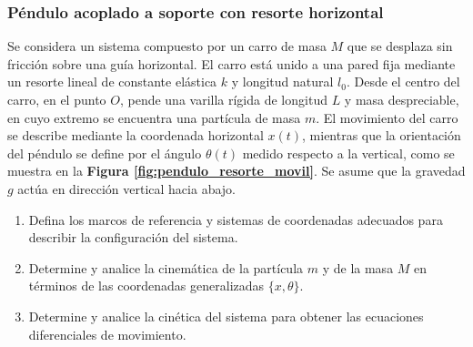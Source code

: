 \subsubsection{Péndulo acoplado a soporte con resorte horizontal}

Se considera un sistema compuesto por un carro de masa $M$ que se desplaza sin fricción sobre una guía horizontal. El carro está unido a una pared fija mediante un resorte lineal de constante elástica $k$ y longitud natural $l_0$. Desde el centro del carro, en el punto $O$, pende una varilla rígida de longitud $L$ y masa despreciable, en cuyo extremo se encuentra una partícula de masa $m$. El movimiento del carro se describe mediante la coordenada horizontal $x(t)$, mientras que la orientación del péndulo se define por el ángulo $\theta(t)$ medido respecto a la vertical, como se muestra en la \textbf{Figura \ref{fig:pendulo_resorte_movil}}. Se asume que la gravedad $g$ actúa en dirección vertical hacia abajo.

\begin{enumerate}
    \item Defina los marcos de referencia y sistemas de coordenadas adecuados para describir la configuración del sistema.
    \item Determine y analice la cinemática de la partícula $m$ y de la masa $M$ en términos de las coordenadas generalizadas $\{x, \theta\}$.
    \item Determine y analice la cinética del sistema para obtener las ecuaciones diferenciales de movimiento.
\end{enumerate}

